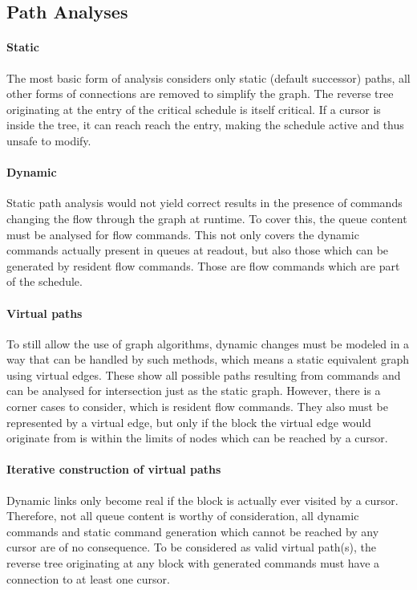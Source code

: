 \subsection{Path Analyses}
\label{ssec:path}
\paragraph{Static}
The most basic form of analysis considers only static (default successor) paths, all other forms of connections are removed to simplify the graph. The reverse tree originating at the entry of the critical schedule is itself critical. If a cursor is inside the tree, it can reach reach the entry, making the schedule active and thus unsafe to modify.

\paragraph{Dynamic}
Static path analysis would not yield correct results in the presence of commands changing the flow through the graph at runtime. To cover this, the queue content must be analysed for flow commands. This not only covers the dynamic commands actually present in queues at readout, but also those which can be generated by resident flow commands. Those are flow commands which are part of the schedule.

\paragraph{Virtual paths}
To still allow the use of graph algorithms, dynamic changes must be modeled in a way that can be handled by such methods, which means a static equivalent graph using virtual edges.
These show all possible paths resulting from commands and can be analysed for intersection just as the static graph. However, there is a corner cases to consider, which is resident flow commands.
 They also must be represented by a virtual edge, but only if the block the virtual edge would originate from is within the limits of nodes which can be reached by
a cursor.

\paragraph{Iterative construction of virtual paths}
Dynamic links only become real if the block is actually ever visited by a cursor. Therefore, not all queue content is worthy of consideration, all dynamic commands and static command generation which cannot be reached by any cursor are of no consequence. To be considered as valid virtual path(s), the reverse tree originating at any block with generated commands must have a connection to at least one cursor.

